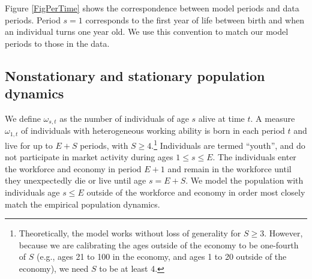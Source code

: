 \documentclass[letterpaper,12pt]{article}
\theoremstyle{definition}
\begin{document}
  Figure \ref{FigPerTime} shows the correspondence between model periods and data periods. Period $s=1$ corresponds to the first year of life between birth and when an individual turns one year old. We use this convention to match our model periods to those in the data.


  \subsection{Nonstationary and stationary population dynamics}\label{AppPopNonStatStat}

    We define $\omega_{s,t}$ as the number of individuals of age $s$ alive at time $t$. A measure $\omega_{1,t}$ of individuals with heterogeneous working ability is born in each period $t$ and live for up to $E+S$ periods, with $S\geq 4$.\footnote{Theoretically, the model works without loss of generality for $S\geq 3$. However, because we are calibrating the ages outside of the economy to be one-fourth of $S$ (e.g., ages 21 to 100 in the economy, and ages 1 to 20 outside of the economy), we need $S$ to be at least 4.} Individuals are termed ``youth'', and do not participate in market activity during ages $1\leq s\leq E$. The individuals enter the workforce and economy in period $E+1$ and remain in the workforce until they unexpectedly die or live until age $s=E+S$. We model the population with individuals age $s\leq E$ outside of the workforce and economy in order most closely match the empirical population dynamics.
\end{document}
